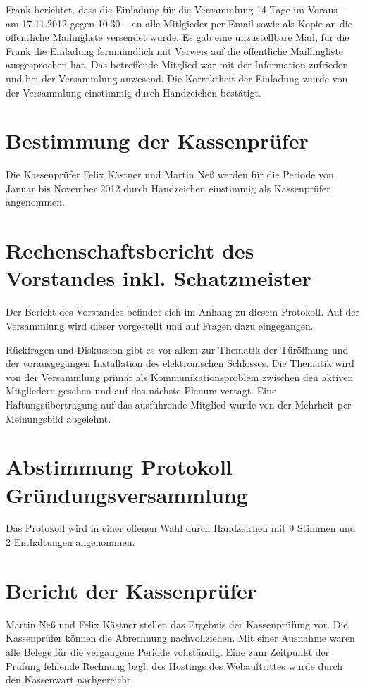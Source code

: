 \documentclass{scrartcl}
\begin{document}
Frank berichtet, dass die Einladung für die Versammlung 14 Tage im
Voraus -- am 17.11.2012 gegen 10:30 -- an alle Mitlgieder per Email
sowie als Kopie an die öffentliche Mailingliste versendet wurde. Es gab
eine unzustellbare Mail, für die Frank die Einladung fernmündlich mit
Verweis auf die öffentliche Maillingliste ausgesprochen hat. Das
betreffende Mitglied war mit der Information zufrieden und bei der
Versammlung anwesend. Die Korrektheit der Einladung wurde von der
Versammlung einstimmig durch Handzeichen bestätigt.

\section{Bestimmung der Kassenprüfer}

Die Kassenprüfer Felix Kästner und Martin Neß werden für die Periode von
Januar bis November 2012 durch Handzeichen einstimmig als Kassenprüfer
angenommen.

\section{Rechenschaftsbericht des Vorstandes inkl. Schatzmeister}
Der Bericht des Vorstandes befindet sich im Anhang zu diesem Protokoll.
Auf der Versammlung wird dieser vorgestellt und auf Fragen dazu
eingegangen.

Rückfragen und Diskussion gibt es vor allem zur Thematik der Türöffnung
und der vorausgegangen Installation des elektronischen Schlosses.
Die Thematik wird von der Versammlung primär als Kommunikationsproblem
zwischen den aktiven Mitgliedern gesehen und auf das nächste Plenum
vertagt.
Eine Haftungsübertragung auf das ausführende Mitglied wurde von der
Mehrheit per Meinungsbild abgelehnt.

\section{Abstimmung Protokoll Gründungsversammlung}
Das Protokoll wird in einer offenen Wahl durch Handzeichen mit 9 Stimmen
und 2 Enthaltungen angenommen.

\section{Bericht der Kassenprüfer}
Martin Neß und Felix Kästner stellen das Ergebnis der Kassenprüfung vor.
Die Kassenprüfer können die Abrechnung nachvollziehen. Mit einer
Ausnahme waren alle Belege für die vergangene Periode vollständig. Eine
zum Zeitpunkt der Prüfung fehlende Rechnung bzgl. des Hostings des
Webauftrittes wurde durch den Kassenwart nachgereicht.
\end{document}
